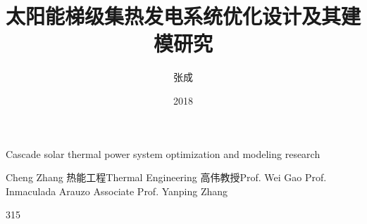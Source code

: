 \makenomenclature

\title{太阳能梯级集热发电系统优化设计\newline 及其建模研究}{Cascade solar thermal power system optimization and modeling research}
\author
{张成}{Cheng Zhang}
\major
{热能工程}{Thermal Engineering}
\supervisor
{高伟\hspace{0.2em}教授}{Prof. Wei Gao \newline Prof. Inmaculada Arauzo \newline Associate Prof. Yanping Zhang}
\date{2018}{3}{15}